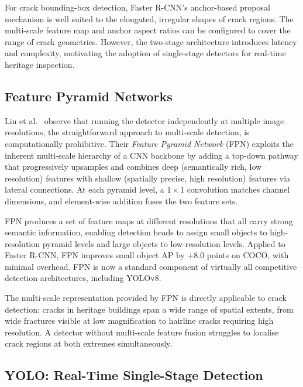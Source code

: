 \documentclass[12pt,a4paper]{article}
\begin{document}
For crack bounding-box detection, Faster R-CNN's anchor-based proposal mechanism is well suited to the elongated, irregular shapes of crack regions. The multi-scale feature map and anchor aspect ratios can be configured to cover the range of crack geometries. However, the two-stage architecture introduces latency and complexity, motivating the adoption of single-stage detectors for real-time heritage inspection.

\subsection{Feature Pyramid Networks}

Lin et al.~\cite{surv:lin2017fpn} observe that running the detector independently at multiple image resolutions, the straightforward approach to multi-scale detection, is computationally prohibitive. Their \textit{Feature Pyramid Network} (FPN) exploits the inherent multi-scale hierarchy of a CNN backbone by adding a top-down pathway that progressively upsamples and combines deep (semantically rich, low resolution) features with shallow (spatially precise, high resolution) features via lateral connections. At each pyramid level, a $1\times1$ convolution matches channel dimensions, and element-wise addition fuses the two feature sets.

FPN produces a set of feature maps at different resolutions that all carry strong semantic information, enabling detection heads to assign small objects to high-resolution pyramid levels and large objects to low-resolution levels. Applied to Faster R-CNN, FPN improves small object AP by $+8.0$ points on COCO, with minimal overhead. FPN is now a standard component of virtually all competitive detection architectures, including YOLOv8.

The multi-scale representation provided by FPN is directly applicable to crack detection: cracks in heritage buildings span a wide range of spatial extents, from wide fractures visible at low magnification to hairline cracks requiring high resolution. A detector without multi-scale feature fusion struggles to localise crack regions at both extremes simultaneously.

\subsection{YOLO: Real-Time Single-Stage Detection}
\end{document}
